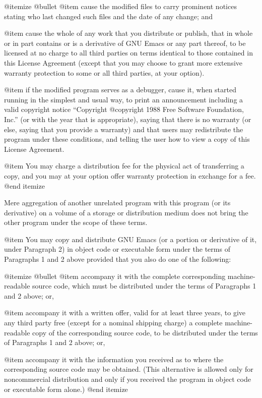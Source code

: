 @itemize @bullet
@item
cause the modified files to carry prominent notices stating
who last changed such files and the date of any change; and

@item
cause the whole of any work that you distribute or publish, that
in whole or in part contains or is a derivative of GNU Emacs or any
part thereof, to be licensed at no charge to all third parties on
terms identical to those contained in this License Agreement
(except that you may choose to grant more extensive warranty
protection to some or all third parties, at your option).

@item
if the modified program serves as a debugger, cause it, when
started running in the simplest and usual way, to print an
announcement including a valid copyright notice ``Copyright
@copyright{} 1988 Free Software Foundation, Inc.'' (or with the
year that is appropriate), saying that there is no warranty (or
else, saying that you provide a warranty) and that users may
redistribute the program under these conditions, and telling the
user how to view a copy of this License Agreement.

@item
You may charge a distribution fee for the physical act of
transferring a copy, and you may at your option offer warranty
protection in exchange for a fee.
@end itemize

Mere aggregation of another unrelated program with this program (or its
derivative) on a volume of a storage or distribution medium does not bring
the other program under the scope of these terms.

@item
You may copy and distribute GNU Emacs (or a portion or derivative of it,
under Paragraph 2) in object code or executable form under the terms
of Paragraphs 1 and 2 above provided that you also do one of the
following:

@itemize @bullet
@item
accompany it with the complete corresponding machine-readable
source code, which must be distributed under the terms of
Paragraphs 1 and 2 above; or,

@item
accompany it with a written offer, valid for at least three
years, to give any third party free (except for a nominal
shipping charge) a complete machine-readable copy of the
corresponding source code, to be distributed under the terms of
Paragraphs 1 and 2 above; or,

@item
accompany it with the information you received as to where the
corresponding source code may be obtained.  (This alternative is
allowed only for noncommercial distribution and only if you
received the program in object code or executable form alone.)
@end itemize


